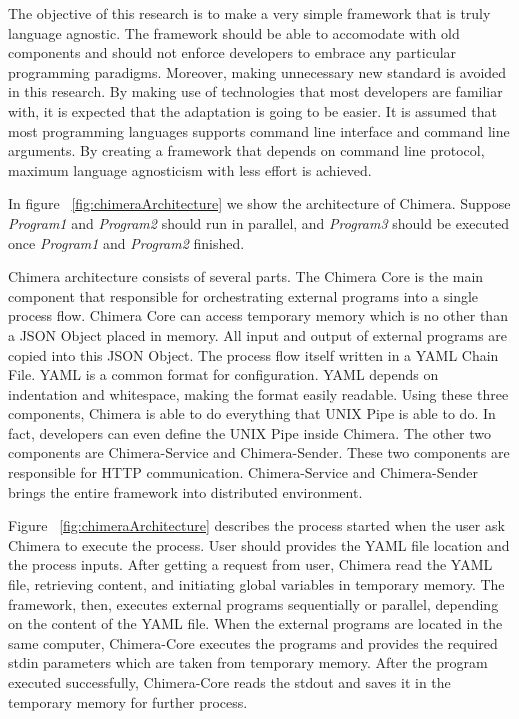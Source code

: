 \documentclass[conference]{IEEEtran}
\begin{document}
The objective of this research is to make a very simple framework that is truly language agnostic. The framework
should be able to accomodate with old components and should not enforce developers to embrace any 
particular programming paradigms. Moreover, making unnecessary new standard is avoided in this research.
By making use of technologies that most developers are familiar with, it is expected that the adaptation is
going to be easier. It is assumed that most programming languages supports command line interface and
command line arguments. By creating a framework that depends on command line protocol,
maximum language agnosticism with less effort is achieved.

In figure ~\ref{fig:chimeraArchitecture} we show the architecture of Chimera. Suppose
{\it Program1} and {\it Program2} should run in parallel, and {\it Program3} should be
executed once {\it Program1} and {\it Program2} finished.

Chimera architecture consists of several parts. The Chimera Core is the main component 
that responsible for orchestrating external programs into a single process flow. 
Chimera Core can access temporary memory which is no other than a JSON Object placed in
memory. All input and output of external programs are copied into this JSON Object.
The process flow itself written in a YAML Chain File. YAML is a common format for
configuration. YAML depends on indentation and whitespace, making the format easily 
readable. Using these three components, Chimera is able to do everything that UNIX Pipe is able to do. 
In fact, developers can even define the UNIX Pipe inside Chimera. The other two components are Chimera-Service and Chimera-Sender. These two components are responsible for HTTP communication. Chimera-Service and Chimera-Sender brings the 
entire framework into distributed environment.

Figure ~\ref{fig:chimeraArchitecture} describes the process started when the user ask Chimera 
to execute the process. User should provides the YAML file location and the process
inputs. After getting a request from user, Chimera read the YAML file, retrieving
content, and initiating global variables in temporary memory. The framework, then,
executes external programs sequentially or parallel, depending on the content of the
YAML file. When the external programs are located in the same computer, Chimera-Core executes the
programs and provides the required stdin parameters which are taken from
temporary memory. After the program executed successfully, Chimera-Core  reads the 
stdout and saves it in the temporary memory for further process.
\end{document}
